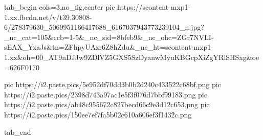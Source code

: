  
 
 
 
 

\ifcmt
  tab_begin cols=3,no_fig,center
     pic https://scontent-mxp1-1.xx.fbcdn.net/v/t39.30808-6/278379630_5069951166417688_6167037943773239104_n.jpg?_nc_cat=105&ccb=1-5&_nc_sid=8bfeb9&_nc_ohc=ZGr7NVLI-sEAX_YxaJs&tn=ZFhpyUAzr6Z8hZdu&_nc_ht=scontent-mxp1-1.xx&oh=00_AT9nDJJw9ZDlVZ5GXS5SzDyanwMyuKBGcpXiZgYRlSHSxg&oe=626F0170

		 pic https://i2.paste.pics/5e952df70dd3b0b2d240c433522c68bf.png
		 pic https://i2.paste.pics/2398d743a97ac1e5f3f076d7bbf99183.png
		 pic https://i2.paste.pics/ab48c955672c827becd66c9e3d12c653.png
		 pic https://i2.paste.pics/150ee7ef7fa5b02c610a606ef3f1432c.png

  tab_end
\fi
